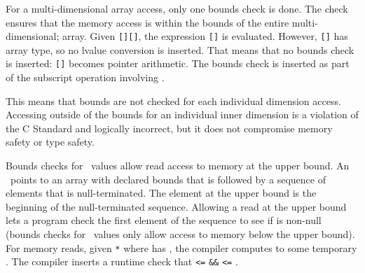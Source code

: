 For a multi-dimensional array access, only one bounds check is done.
The check ensures that the memory access is within the bounds of the entire multi-dimensional;
array.  Given  \lstinline|[|\lstinline|][|\lstinline|]|, the expression
\lstinline|[|\lstinline|]| is
evaluated.  However, \lstinline|[|\lstinline|]| has array type, so no lvalue
conversion is inserted. That means that no bounds check is inserted:
\lstinline|[|\lstinline|]| becomes pointer arithmetic. The bounds check
is inserted as part of the subscript operation involving .

This means that bounds are not checked for each individual dimension access.
Accessing outside of the bounds for an
individual inner dimension is a violation of the C Standard and logically incorrect,
but it does not compromise memory safety or type safety.

Bounds checks for \ntarrayptr\ values allow read access to memory
at the upper bound.  An \ntarrayptr\ points to an array with declared bounds
that is followed by a sequence of elements that is null-terminated.
The element at the upper bound is the beginning of the null-terminated
sequence.  Allowing a read at the upper bound lets a program check the
first element of the sequence to see if is non-null
(bounds checks for \arrayptr\ values only allow access to
memory below the upper bound).  For memory reads,
given \lstinline|*| where {} has {},
the compiler computes  to some temporary .
The compiler inserts a runtime check that   \lstinline|<=| \lstinline|&&|
 \lstinline|<=| .

